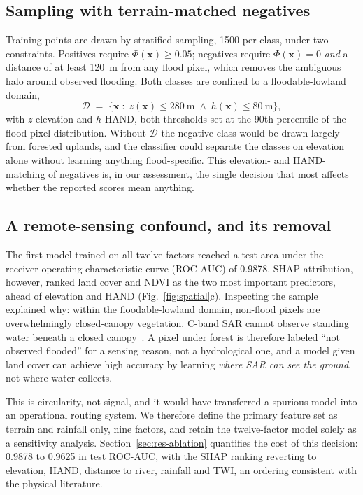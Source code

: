 \documentclass[10pt,twocolumn]{article}
\begin{document}
\subsection{Sampling with terrain-matched negatives}
Training points are drawn by stratified sampling, \num{1500} per class, under two
constraints. Positives require $\Phi(\mathbf{x})\ge 0.05$; negatives require
$\Phi(\mathbf{x})=0$ \emph{and} a distance of at least \SI{120}{\metre} from any
flood pixel, which removes the ambiguous halo around observed flooding. Both
classes are confined to a floodable-lowland domain,
\begin{equation}
\mathcal{D} \;=\; \bigl\{\mathbf{x} \;:\; z(\mathbf{x}) \le \SI{280}{\metre}
\;\wedge\; h(\mathbf{x}) \le \SI{80}{\metre}\bigr\},
\label{eq:domain}
\end{equation}
with $z$ elevation and $h$ HAND, both thresholds set at the 90th percentile of
the flood-pixel distribution. Without $\mathcal{D}$ the negative class would be
drawn largely from forested uplands, and the classifier could separate the
classes on elevation alone without learning anything flood-specific. This
elevation- and HAND-matching of negatives is, in our assessment, the single
decision that most affects whether the reported scores mean anything.

\subsection{A remote-sensing confound, and its removal}
\label{sec:method-confound}
The first model trained on all twelve factors reached a test area under the receiver operating characteristic curve (ROC-AUC) of 0.9878.
SHAP attribution, however, ranked land cover and NDVI as the two most important
predictors, ahead of elevation and HAND (Fig.~\ref{fig:spatial}c). Inspecting
the sample explained why: within the floodable-lowland domain, non-flood pixels
are overwhelmingly closed-canopy vegetation. C-band SAR cannot observe standing
water beneath a closed canopy~\citep{townsend2002,tsyganskaya2018}. A pixel under
forest is therefore labeled ``not observed flooded'' for a sensing reason, not a
hydrological one, and a model given land cover can achieve high accuracy by
learning \emph{where SAR can see the ground}, not where water collects.

This is circularity, not signal, and it would have transferred a spurious model
into an operational routing system. We therefore define the primary feature set
as terrain and rainfall only, nine factors, and retain the twelve-factor model
solely as a sensitivity analysis. Section~\ref{sec:res-ablation} quantifies the
cost of this decision: 0.9878 to 0.9625 in test ROC-AUC, with the SHAP ranking
reverting to elevation, HAND, distance to river, rainfall and TWI, an ordering
consistent with the physical literature.
\end{document}
